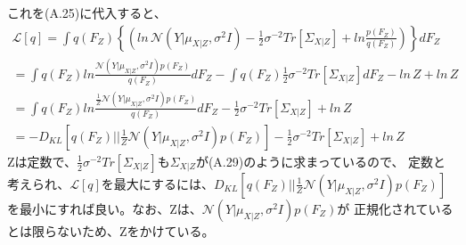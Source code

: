 \documentclass{jsarticle}
\begin{document}
これを(A.25)に代入すると、
\begin{equation}
\begin{split}
\mathcal{L}[q] = \int q(F_Z)  \left\{ \left(ln \, \mathcal{N}(Y | \mu_{X | Z}, \sigma^2 I) - \frac{1}{2}\sigma^{-2} Tr[\Sigma_{X | Z}] + ln \frac{p(F_Z)}{q(F_Z)} \right) \right\} dF_Z\\
= \int q(F_Z) ln \frac{\mathcal{N}(Y | \mu_{X | Z}, \sigma^2 I)p(F_Z)}{q(F_Z)} dF_Z - \int q(F_Z) \frac{1}{2}\sigma^{-2} Tr[\Sigma_{X | Z}] dF_Z -ln \, Z + ln \, Z\\
= \int q(F_Z) ln \frac{\frac{1}{Z}\mathcal{N}(Y | \mu_{X | Z}, \sigma^2 I)p(F_Z)}{q(F_Z)} dF_Z - \frac{1}{2}\sigma^{-2} Tr[\Sigma_{X | Z}] + ln \, Z\\
= - D_{KL}[q(F_Z) || \frac{1}{Z}\mathcal{N}(Y | \mu_{X | Z}, \sigma^2 I)p(F_Z)] - \frac{1}{2}\sigma^{-2} Tr[\Sigma_{X | Z}] + ln \, Z
\end{split}
\end{equation}
Zは定数で、$\frac{1}{2}\sigma^{-2} Tr[\Sigma_{X | Z}]$も$\Sigma_{X | Z}$が(A.29)のように求まっているので、
定数と考えられ、$\mathcal{L}[q]$を最大にするには、$D_{KL}[q(F_Z) || \frac{1}{Z}\mathcal{N}(Y | \mu_{X | Z}, \sigma^2 I)p(F_Z)]$を最小にすれば良い。なお、Zは、$\mathcal{N}(Y | \mu_{X | Z}, \sigma^2 I)p(F_Z)$が
正規化されているとは限らないため、Zをかけている。
\end{document}
